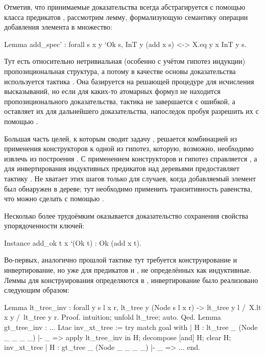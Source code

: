 \documentclass[a4paper,14pt]{extarticle}
\begin{document}
Отметив, что принимаемые доказательства 
всегда абстрагируется с помощью класса предикатов %
,
рассмотрим лемму, формализующую семантику операции
добавления элемента в множество:
\begin{coqcode}
Lemma add_spec' : forall s x y `{Ok s},
  InT y (add x s) <-> X.eq y x \/ InT y s.
\end{coqcode}

Тут есть относительно нетривиальная
(особенно с учётом гипотез индукции)
пропозициональная структура, а потому
в качестве основы доказательства используется тактика
. Она базируется на решающей процедуре
для исчисления высказываний, но если для каких-то атомарных
формул не находится пропозиционального доказательства,
тактика не завершается с ошибкой, а
оставляет их для дальнейшего доказательства, 
напоследок пробуя разрешить их с помощью
.

Большая часть целей, к которым сводит задачу
,
решается комбинацией из применения конструкторов
 к одной из гипотез,
которую, возможно, необходимо извлечь
из построения .
С применением конструкторов и гипотез
справляется ,
а для инвертирования
индуктивных предикатов над деревьями
 предоставляет тактику
.
Не хватает этих шагов только
для случаев, когда добавляемый элемент
был обнаружен в дереве;
тут необходимо применить транзитивность
равенства, что можно сделать
с помощью .

Несколько более трудоёмким оказывается доказательство
сохранения свойства упорядоченности ключей:
\begin{coqcode}
Instance add_ok t x `(Ok t) : Ok (add x t).
\end{coqcode}

Во-первых, аналогично прошлой тактике
тут требуется конструирование и инвертирование,
но уже для предикатов
 и ,
не определённых как индуктивные.
Леммы для конструирования определяются в ,
инвертирование было реализовано следующим образом:
\begin{coqcode}
Lemma lt_tree_inv : forall y s l x r,
  lt_tree y (Node s l x r) ->
  lt_tree y l /\ X.lt x y /\ lt_tree y r.
Proof. intuition; unfold lt_tree; auto. Qed.
Lemma gt_tree_inv : ...
Ltac inv_xt_tree := try match goal with
  | H : lt_tree _ (Node _ _ _ _) |- _ =>
    apply lt_tree_inv in H;
    decompose [and] H; clear H;
    inv_xt_tree
  | H : gt_tree _ (Node _ _ _ _) |- _ => ...
end.
\end{coqcode}
\end{document}
